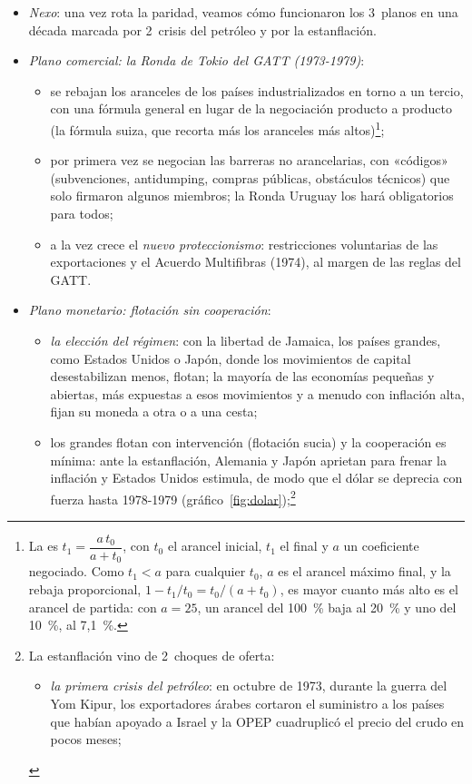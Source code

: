 \documentclass[11pt]{article}
\begin{document}
\begin{itemize}
\item \emph{Nexo}: una vez rota la paridad, veamos cómo funcionaron los 3~planos en una década marcada por 2~crisis del petróleo y por la estanflación.
\item \emph{Plano comercial: la Ronda de Tokio del GATT (1973-1979)}:
  \begin{itemize}
  \item se rebajan los aranceles de los países industrializados en torno a un tercio, con una fórmula general en lugar de la negociación producto a producto (la fórmula suiza, que recorta más los aranceles más altos)\footnote{La  es $t_1=\dfrac{a\,t_0}{a+t_0}$, con $t_0$ el arancel inicial, $t_1$ el final y $a$ un coeficiente negociado. Como $t_1<a$ para cualquier $t_0$, $a$ es el arancel máximo final, y la rebaja proporcional, $1-t_1/t_0=t_0/(a+t_0)$, es mayor cuanto más alto es el arancel de partida: con $a=25$, un arancel del 100~\% baja al 20~\% y uno del 10~\%, al 7,1~\%. };
  \item por primera vez se negocian las barreras no arancelarias, con «códigos» (subvenciones, antidumping, compras públicas, obstáculos técnicos) que solo firmaron algunos miembros; la Ronda Uruguay los hará obligatorios para todos;
  \item a la vez crece el \emph{nuevo proteccionismo}: restricciones voluntarias de las exportaciones y el Acuerdo Multifibras (1974), al margen de las reglas del GATT.
  \end{itemize}
\item \emph{Plano monetario: flotación sin cooperación}:
  \begin{itemize}
  \item \emph{la elección del régimen}: con la libertad de Jamaica, los países grandes, como Estados Unidos o Japón, donde los movimientos de capital desestabilizan menos, flotan; la mayoría de las economías pequeñas y abiertas, más expuestas a esos movimientos y a menudo con inflación alta, fijan su moneda a otra o a una cesta;
  \item los grandes flotan con intervención (flotación sucia) y la cooperación es mínima: ante la estanflación, Alemania y Japón aprietan para frenar la inflación y Estados Unidos estimula, de modo que el dólar se deprecia con fuerza hasta 1978-1979 (gráfico~\ref{fig:dolar});\footnote{La estanflación vino de 2~choques de oferta:
    \begin{itemize}
    \item \emph{la primera crisis del petróleo}: en octubre de 1973, durante la guerra del Yom Kipur, los exportadores árabes cortaron el suministro a los países que habían apoyado a Israel y la OPEP cuadruplicó el precio del crudo en pocos meses;

\end{itemize}}
\end{itemize}
\end{itemize}
\end{document}
